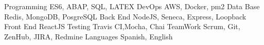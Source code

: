 


\begin{cvskills}

\cvskill
{Programming} %
{ES6, ABAP, SQL, LATEX} %
\cvskill
{DevOps} %
{AWS, Docker, pm2} %
\cvskill
{Data Base} %
{Redis, MongoDB, PosgreSQL} %
\cvskill
{Back End} %
{NodeJS,  Seneca, Express, Loopback} %
\cvskill
{Front End} %
{ReactJS} %
\cvskill
{Testing} %
{Travis CI,Mocha, Chai} %
\cvskill
{TeamWork} %
{Scrum, Git, ZenHub, JIRA, Redmine} %
\cvskill
{Languages} %
{Spanish, English} %
\end{cvskills}
